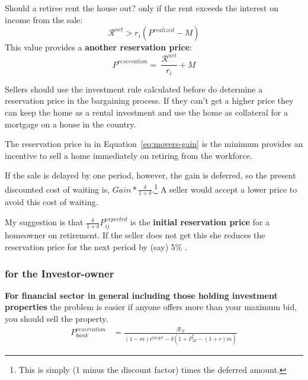 Should a retiree rent the house out? only if the rent exceeds the  interest on income from the sale:
\[\mathcal{R}^{net}>r_i(P^{realized}-M)\]
This value provides a \textbf{another reservation price}: 
\[P^{reservation} =\ \frac{\mathcal{R}^{net}}{r_i}+M \label{eq:movers-gainC}\]


Sellers should use the investment rule calculated before  do determine a  reservation price in the bargaining process. If they can't get a higher price they  can keep the home as a rental  investment and use the home as collateral for a mortgage on a house in the country.

The reservation price in in Equation~\ref {eq:movers-gain} is the minimum provides an incentive to sell a home immediately on retiring from the workforce. 



If the sale is delayed by one period, however, the gain is deferred, so the present discounted cost of waiting is, $Gain*\frac{\delta}{1+\delta}$.\footnote{This is simply (1 minus the discount factor) times the deferred amount.} A seller would accept a lower price to avoid this cost of waiting. 

My suggestion is that $\frac{\delta}{1+\delta}P_{ij}^{expected}$ is the \textbf{initial reservation price} for a homeowner on retirement. If the seller does not get this she reduces the reservation price for the next period by (say) 5\% .


\subsubsection{for the Investor-owner}
\textbf{For financial sector in general including those holding investment properties} the problem is easier if anyone offers more than your maximum bid, you should sell the property. 
\begin{eqnarray}
P_{bank}^{reservation} & =    \frac{\mathcal{R}_N}{(1-m)r^{target}-\delta \left(1 + \dot P_M^e - (1+r)m\right)} \label{eqn-res-price-B} \end{eqnarray}

